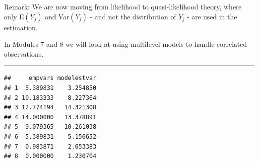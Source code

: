 \documentclass[
]{article}
\newenvironment{Shaded}{\begin{snugshade}}{\end{snugshade}}
\newcommand{\AttributeTok}[1]{\textcolor[rgb]{0.13,0.29,0.53}{#1}}
\newcommand{\DecValTok}[1]{\textcolor[rgb]{0.00,0.00,0.81}{#1}}
\newcommand{\FunctionTok}[1]{\textcolor[rgb]{0.13,0.29,0.53}{\textbf{#1}}}
\newcommand{\NormalTok}[1]{#1}
\newcommand{\OtherTok}[1]{\textcolor[rgb]{0.56,0.35,0.01}{#1}}
\newcommand{\SpecialCharTok}[1]{\textcolor[rgb]{0.81,0.36,0.00}{\textbf{#1}}}
\newcommand{\StringTok}[1]{\textcolor[rgb]{0.31,0.60,0.02}{#1}}
\begin{document}
Remark: We are now moving from likelihood to quasi-likelihood theory,
where only E\((Y_j)\) and Var\((Y_j)\) - and not the distribution of
\(Y_j\) - are used in the estimation.

In Modules 7 and 8 we will look at using multilevel models to handle
correlated observations.

\begin{center}\rule{0.5\linewidth}{0.5pt}\end{center}

\begin{Shaded}
\end{Shaded}

\begin{verbatim}
##     empvars modelestvar
## 1  5.389831    3.254850
## 2 10.183333    8.227364
## 3 12.774194   14.321308
## 4 14.000000   13.378891
## 5  9.079365   10.261038
## 6  5.389831    5.156652
## 7  0.983871    2.653383
## 8  0.000000    1.230704
\end{verbatim}

\begin{Shaded}
\end{Shaded}
\end{document}

